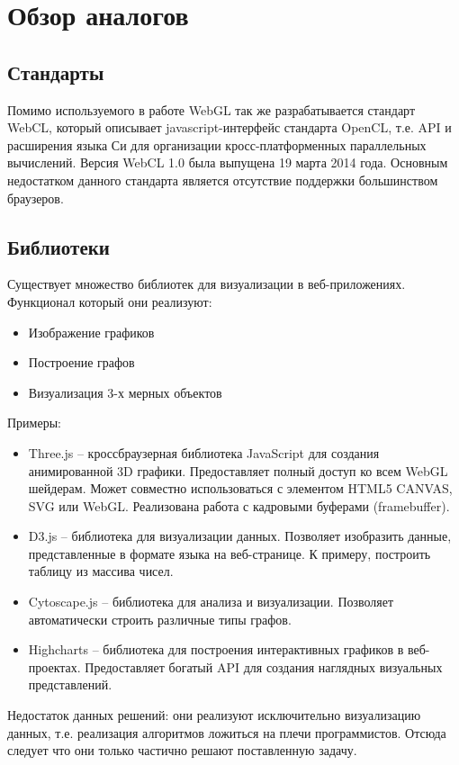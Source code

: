 \newpage
\section{Обзор аналогов}

\subsection{Стандарты}

Помимо используемого в работе WebGL так же разрабатывается стандарт WebCL, который описывает 
javascript-интерфейс стандарта OpenCL, т.е. API и расширения языка Си для организации
кросс-платформенных параллельных вычислений. Версия WebCL 1.0 была выпущена 19 марта 2014 года.
Основным недостатком данного стандарта является отсутствие поддержки большинством браузеров.

\subsection{Библиотеки}
Существует множество библиотек для визуализации в веб-приложениях. Функционал который они реализуют:
\begin{itemize}
  \item Изображение графиков
  \item Построение графов
  \item Визуализация 3-х мерных объектов
\end{itemize}

Примеры:
\begin{itemize}
  \item Three.js -- кроссбраузерная библиотека JavaScript для создания анимированной 3D графики.
    Предоставляет полный доступ ко всем WebGL шейдерам. Может совместно использоваться с элементом
    HTML5 CANVAS, SVG или WebGL. Реализована работа с кадровыми буферами (framebuffer).

  \item D3.js -- библиотека для визуализации данных. Позволяет изобразить данные, представленные в
    формате языка на веб-странице. К примеру, построить таблицу из массива чисел.
    
  \item Cytoscape.js -- библиотека для анализа и визуализации. Позволяет автоматически 
    строить различные типы графов.

  \item Highcharts -- библиотека для построения интерактивных графиков в веб-проектах. Предоставляет
    богатый API для создания наглядных визуальных представлений.
\end{itemize}

Недостаток данных решений: они реализуют исключительно визуализацию данных, т.е. реализация
алгоритмов ложиться на плечи программистов. Отсюда следует что они только частично решают поставленную
задачу.
